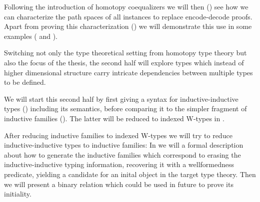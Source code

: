Following the introduction of homotopy coequalizers we will then ()
see how we can
characterize the path spaces of all instances to replace encode-decode proofs.
Apart from proving this characterization ()
we will demonstrate this use in some examples (
and ).

Switching not only the type theoretical setting from homotopy type theory
but also the focus of the thesis, the second half will explore types which
instead of higher dimensional structure carry intricate dependencies between
multiple types to be defined.

We will start this second half by first giving a syntax for inductive-inductive
types () including its semantics,
before comparing it to the simpler fragment of inductive families ().
The latter will be reduced to indexed W-types in .

After reducing inductive families to indexed W-types we will try to reduce
inductive-inductive types to inductive families:
In  we will a formal description about how to generate the
inductive families which correspond to
erasing the inductive-inductive typing information,
recovering it with a wellformedness predicate, yielding a candidate for an inital
object in the target type theory.
Then we will present a binary relation which could be used in future to prove
its initiality.










